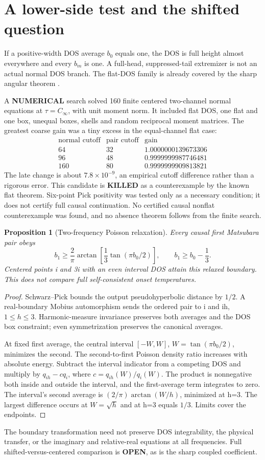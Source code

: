 \documentclass[11pt]{article}
\newtheorem{proposition}{Proposition}
\begin{document}
\section{A lower-side test and the shifted question}
If a positive-width DOS average $b_0$ equals one, the DOS is full height almost everywhere and every $b_m$ is one. A full-head, suppressed-tail extremizer is not an actual normal DOS branch. The flat-DOS family is already covered by the sharp angular theorem \cite{gsi}.

A \textbf{NUMERICAL} search solved 160 finite centered two-channel normal equations at $\tau=C_\infty$, with unit moment norm. It included flat DOS, one flat and one box, unequal boxes, shells and random reciprocal moment matrices. The greatest coarse gain was a tiny excess in the equal-channel flat case:
\[
\begin{array}{c|c|c}
\text{normal cutoff}&\text{pair cutoff}&\text{gain}\\\hline
64&32&1.0000000139673306\\
96&48&0.9999999987746481\\
160&80&0.9999999909813821
\end{array}
\]
The late change is about $7.8\times10^{-9}$, an empirical cutoff difference rather than a rigorous error. This candidate is \textbf{KILLED} as a counterexample by the known flat theorem. Six-point Pick positivity was tested only as a necessary condition; it does not certify full causal continuation. No certified causal nonflat counterexample was found, and no absence theorem follows from the finite search.

\begin{proposition}[Two-frequency Poisson relaxation]
Every causal first Matsubara pair obeys
\[
 b_1\ge\frac2\pi\arctan\left[\frac13\tan(\pi b_0/2)\right],\qquad b_1\ge b_0-\frac13.
\]
Centered points i and 3i with an even interval DOS attain this relaxed boundary. This does not compare full self-consistent onset temperatures.
\end{proposition}
\begin{proof}
Schwarz--Pick bounds the output pseudohyperbolic distance by $1/2$. A real-boundary Mobius automorphism sends the ordered pair to i and ih, $1\le h\le3$. Harmonic-measure invariance preserves both averages and the DOS box constraint; even symmetrization preserves the canonical averages.

At fixed first average, the central interval $[-W,W]$, $W=\tan(\pi b_0/2)$, minimizes the second. The second-to-first Poisson density ratio increases with absolute energy. Subtract the interval indicator from a competing DOS and multiply by $q_{ih}-cq_i$, where $c=q_{ih}(W)/q_i(W)$. The product is nonnegative both inside and outside the interval, and the first-average term integrates to zero. The interval's second average is $(2/\pi)\arctan(W/h)$, minimized at h=3. The largest difference occurs at $W=\sqrt h$ and at h=3 equals $1/3$. Limits cover the endpoints.
\end{proof}
The boundary transformation need not preserve DOS integrability, the physical transfer, or the imaginary and relative-real equations at all frequencies. Full shifted-versus-centered comparison is \textbf{OPEN}, as is the sharp coupled coefficient.
\end{document}
